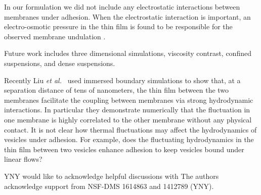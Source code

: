 \documentclass[prf,superscriptaddress,showpacs]{revtex4-1}
\begin{document}
In our formulation we did not include any electrostatic interactions between membranes under adhesion. When the electrostatic interaction is important, an electro-osmotic pressure
in the thin film is found to be responsible for the observed membrane undulation \cite{LiraDimova}.

Future work includes three dimensional simulations, viscosity contrast,
confined suspensions, and dense suspensions.

Recently Liu {\em et al.}~\cite{LiuChuNewbyRead2018_bioRxiv} used
immersed boundary simulations to show that, at a separation distance of
tens of nanometers, the thin film between the two membranes facilitate
the coupling between membranes via strong hydrodynamic interactions. In
particular they demonstrate numerically that the fluctuation in one
membrane is highly correlated to the other membrane without any physical
contact. It is not clear how thermal fluctuations may affect the
hydrodynamics of vesicles under adhesion. For example, does the
fluctuating hydrodynamics in the thin film between two vesicles enhance
adhesion to keep vesicles bound under linear flows?

\acknowledgments

YNY would like to acknowledge helpful discussions with 
The authors acknowledge support from NSF-DMS 1614863 and 1412789 (YNY).
\end{document}
